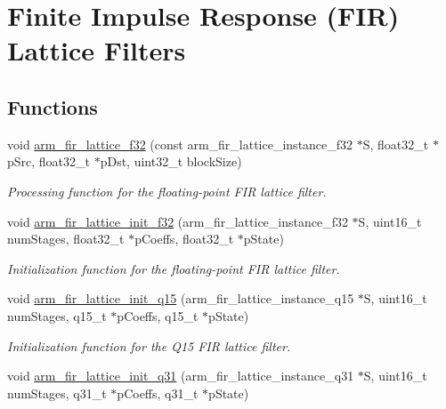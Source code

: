 \hypertarget{group__FIR__Lattice}{}\section{Finite Impulse Response (F\+IR) Lattice Filters}
\label{group__FIR__Lattice}
\subsection*{Functions}
\begin{DoxyCompactItemize}
\item 
void \hyperlink{group__FIR__Lattice_gae63a45a63a11a65f2eae8b8b1fe370a8}{arm\+\_\+fir\+\_\+lattice\+\_\+f32} (const arm\+\_\+fir\+\_\+lattice\+\_\+instance\+\_\+f32 $\ast$S, float32\+\_\+t $\ast$p\+Src, float32\+\_\+t $\ast$p\+Dst, uint32\+\_\+t block\+Size)
\begin{DoxyCompactList}\small\item\em Processing function for the floating-\/point F\+IR lattice filter. \end{DoxyCompactList}\item 
void \hyperlink{group__FIR__Lattice_ga86199a1590af2b8941c6532ee9d03229}{arm\+\_\+fir\+\_\+lattice\+\_\+init\+\_\+f32} (arm\+\_\+fir\+\_\+lattice\+\_\+instance\+\_\+f32 $\ast$S, uint16\+\_\+t num\+Stages, float32\+\_\+t $\ast$p\+Coeffs, float32\+\_\+t $\ast$p\+State)
\begin{DoxyCompactList}\small\item\em Initialization function for the floating-\/point F\+IR lattice filter. \end{DoxyCompactList}\item 
void \hyperlink{group__FIR__Lattice_ga1b22f30ce1cc19bf5a5d7c9fca154d72}{arm\+\_\+fir\+\_\+lattice\+\_\+init\+\_\+q15} (arm\+\_\+fir\+\_\+lattice\+\_\+instance\+\_\+q15 $\ast$S, uint16\+\_\+t num\+Stages, q15\+\_\+t $\ast$p\+Coeffs, q15\+\_\+t $\ast$p\+State)
\begin{DoxyCompactList}\small\item\em Initialization function for the Q15 F\+IR lattice filter. \end{DoxyCompactList}\item 
void \hyperlink{group__FIR__Lattice_gac05a17a0188bb851b58d19e572870a54}{arm\+\_\+fir\+\_\+lattice\+\_\+init\+\_\+q31} (arm\+\_\+fir\+\_\+lattice\+\_\+instance\+\_\+q31 $\ast$S, uint16\+\_\+t num\+Stages, q31\+\_\+t $\ast$p\+Coeffs, q31\+\_\+t $\ast$p\+State)

\end{DoxyCompactItemize}
